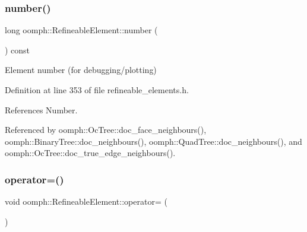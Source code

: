 \mbox{\label{classoomph_1_1RefineableElement_a49698dae92649ebf102dfb4359d7b0bf}} 
\subsubsection{\texorpdfstring{number()}{number()}}
{\footnotesize\ttfamily long oomph\+::\+Refineable\+Element\+::number (\begin{DoxyParamCaption}{ }\end{DoxyParamCaption}) const\hspace{0.3cm}{\ttfamily [inline]}}



Element number (for debugging/plotting) 



Definition at line 353 of file refineable\+\_\+elements.\+h.



References Number.



Referenced by oomph\+::\+Oc\+Tree\+::doc\+\_\+face\+\_\+neighbours(), oomph\+::\+Binary\+Tree\+::doc\+\_\+neighbours(), oomph\+::\+Quad\+Tree\+::doc\+\_\+neighbours(), and oomph\+::\+Oc\+Tree\+::doc\+\_\+true\+\_\+edge\+\_\+neighbours().

\mbox{\label{classoomph_1_1RefineableElement_a956e3350b763de6a0d96915608fee827}} 
\subsubsection{\texorpdfstring{operator=()}{operator=()}}
{\footnotesize\ttfamily void oomph\+::\+Refineable\+Element\+::operator= (\begin{DoxyParamCaption}\item[{const \hyperlink{classoomph_1_1RefineableElement}{Refineable\+Element} \&}]{ }\end{DoxyParamCaption})\hspace{0.3cm}{\ttfamily [inline]}}



